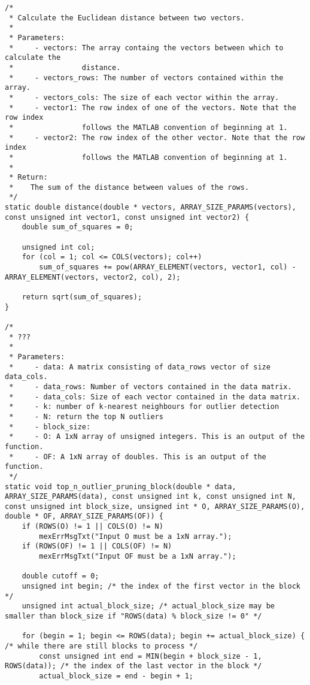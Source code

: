 \begin{lstlisting}
/*
 * Calculate the Euclidean distance between two vectors.
 *
 * Parameters:
 *     - vectors: The array containg the vectors between which to calculate the 
 *                distance.
 *     - vectors_rows: The number of vectors contained within the array.
 *     - vectors_cols: The size of each vector within the array.
 *     - vector1: The row index of one of the vectors. Note that the row index 
 *                follows the MATLAB convention of beginning at 1.
 *     - vector2: The row index of the other vector. Note that the row index 
 *                follows the MATLAB convention of beginning at 1.
 *
 * Return:
 *    The sum of the distance between values of the rows.
 */
static double distance(double * vectors, ARRAY_SIZE_PARAMS(vectors), const unsigned int vector1, const unsigned int vector2) {
    double sum_of_squares = 0;
    
    unsigned int col;
    for (col = 1; col <= COLS(vectors); col++)
        sum_of_squares += pow(ARRAY_ELEMENT(vectors, vector1, col) - ARRAY_ELEMENT(vectors, vector2, col), 2);
        
    return sqrt(sum_of_squares);
}

/*
 * ???
 *
 * Parameters:
 *     - data: A matrix consisting of data_rows vector of size data_cols.
 *     - data_rows: Number of vectors contained in the data matrix.
 *     - data_cols: Size of each vector contained in the data matrix.
 *     - k: number of k-nearest neighbours for outlier detection
 *     - N: return the top N outliers
 *     - block_size:
 *     - O: A 1xN array of unsigned integers. This is an output of the function.
 *     - OF: A 1xN array of doubles. This is an output of the function.
 */
static void top_n_outlier_pruning_block(double * data, ARRAY_SIZE_PARAMS(data), const unsigned int k, const unsigned int N, const unsigned int block_size, unsigned int * O, ARRAY_SIZE_PARAMS(O), double * OF, ARRAY_SIZE_PARAMS(OF)) {
	if (ROWS(O) != 1 || COLS(O) != N)
    	mexErrMsgTxt("Input O must be a 1xN array.");
    if (ROWS(OF) != 1 || COLS(OF) != N)
    	mexErrMsgTxt("Input OF must be a 1xN array.");

	double cutoff = 0;
	unsigned int begin; /* the index of the first vector in the block */
	unsigned int actual_block_size; /* actual_block_size may be smaller than block_size if "ROWS(data) % block_size != 0" */
	
    for (begin = 1; begin <= ROWS(data); begin += actual_block_size) { /* while there are still blocks to process */
    	const unsigned int end = MIN(begin + block_size - 1, ROWS(data)); /* the index of the last vector in the block */
    	actual_block_size = end - begin + 1;
    

\end{lstlisting}
